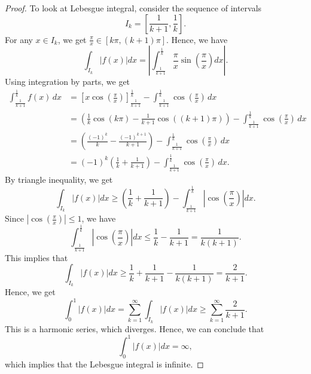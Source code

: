 \begin{proof}
    To look at Lebesgue integral, consider the sequence of intervals
    \[
    I_k = [\frac{1}{k+1}, \frac{1}{k}].
    \]
    For any $x \in I_k$, we get $\frac{\pi}{x} \in [k\pi, (k+1)\pi]$. Hence, we have
    \[
    \int_{I_k} |f(x)| dx = \left| \int_{\frac{1}{k+1}}^{\frac{1}{k}} \frac{\pi}{x} \sin\left(\frac{\pi}{x}\right) dx \right|.
    \]
    Using integration by parts, we get
    \[
    \begin{aligned}
    \int_{\frac{1}{k+1}}^{\frac{1}{k}} f(x)\,dx
    &=
    \left[ x \cos\left(\frac{\pi}{x}\right) \right]_{\frac{1}{k+1}}^{\frac{1}{k}}
    -
    \int_{\frac{1}{k+1}}^{\frac{1}{k}} \cos\left(\frac{\pi}{x}\right)\,dx \\[6pt]
    &=
    \left(
    \frac{1}{k}\cos(k\pi)
    -
    \frac{1}{k+1}\cos((k+1)\pi)
    \right)
    -
    \int_{\frac{1}{k+1}}^{\frac{1}{k}} \cos\left(\frac{\pi}{x}\right)\,dx \\[6pt]
    &=
    \left(
    \frac{(-1)^k}{k}
    -
    \frac{(-1)^{k+1}}{k+1}
    \right)
    -
    \int_{\frac{1}{k+1}}^{\frac{1}{k}} \cos\left(\frac{\pi}{x}\right)\,dx \\[6pt]
    &=
    (-1)^k
    \left(
    \frac{1}{k}
    +
    \frac{1}{k+1}
    \right)
    -
    \int_{\frac{1}{k+1}}^{\frac{1}{k}} \cos\left(\frac{\pi}{x}\right)\,dx .
    \end{aligned}
    \]
    By triangle inequality, we get
    \[
    \int_{I_k} |f(x)| dx \ge \left( \frac{1}{k} + \frac{1}{k+1} \right) - \int_{\frac{1}{k+1}}^{\frac{1}{k}} \left|\cos\left(\frac{\pi}{x}\right)\right| dx.
    \]
    Since $\left|\cos\left(\frac{\pi}{x}\right)\right| \le 1$, we have
    \[
    \int_{\frac{1}{k+1}}^{\frac{1}{k}} \left|\cos\left(\frac{\pi}{x}\right)\right| dx \le \frac{1}{k} - \frac{1}{k+1} = \frac{1}{k(k+1)}.
    \]
    This implies that
    \[
    \int_{I_k} |f(x)| dx \ge \frac{1}{k} + \frac{1}{k+1} - \frac{1}{k(k+1)} = \frac{2}{k+1}.
    \]
    Hence, we get
    \[
    \int_0^1 |f(x)| dx = \sum_{k=1}^\infty \int_{I_k} |f(x)| dx \ge \sum_{k=1}^\infty \frac{2}{k+1}.
    \]
    This is a harmonic series, which diverges. Hence, we can conclude that
    \[
    \int_0^1 |f(x)| dx = \infty,
    \]
    which implies that the Lebesgue integral is infinite.
\end{proof}

